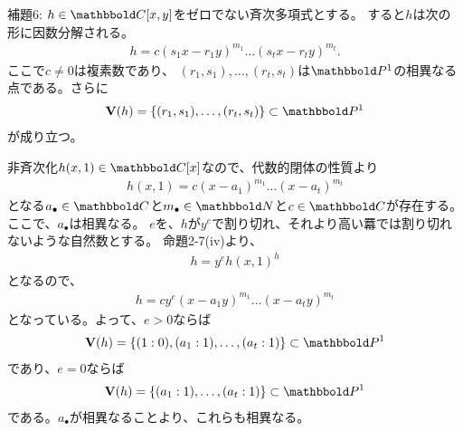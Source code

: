 \begin{framed}
  補題6:
  $h\in \C[x,y]$をゼロでない斉次多項式とする。
  すると$h$は次の形に因数分解される。
  \begin{align}
    h= c(s_1 x - r_1 y)^{m_1} \dots (s_tx -r_t y)^{m_t}.
  \end{align}
  ここで$c\neq 0$は複素数であり、
  $(r_1,s_1),\dots,(r_t,s_t)$は$\P^1$の相異なる点である。さらに
  \begin{align}
    \var(h) = \set{(r_1,s_1),\dots,(r_t,s_t)} \subset \P^1
  \end{align}
  が成り立つ。
\end{framed}
\begin{myproof}
  非斉次化$h(x,1)\in \C[x]$なので、代数的閉体の性質より
  \begin{align}
    h(x,1) = c(x-a_1)^{m_1} \dots (x-a_t)^{m_t}
  \end{align}
  となる$a_\bullet\in \C$と$m_\bullet \in \N$と$c \in \C$が存在する。
  ここで、$a_\bullet$は相異なる。
  $e$を、$h$が$y^e$で割り切れ、それより高い羃では割り切れないような自然数とする。
  命題2-7(iv)より、
  \begin{align}
    h = y^e h(x,1)^h
  \end{align}
  となるので、
  \begin{align}
    h = c y^e (x-a_1 y)^{m_1}\dots (x-a_t y)^{m_t}
  \end{align}
  となっている。よって、$e>0$ならば
  \begin{align}
    \var(h) = \set{(1:0),(a_1:1),\dots,(a_t:1)} \subset \P^1
  \end{align}
  であり、$e=0$ならば
  \begin{align}
    \var(h) = \set{(a_1:1),\dots,(a_t:1)} \subset \P^1
  \end{align}
  である。$a_\bullet$が相異なることより、これらも相異なる。
\end{myproof}

